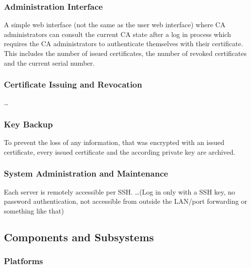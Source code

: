\documentclass{article}
\begin{document}
\subsubsection{Administration Interface}

A simple web interface (not the same as the user web interface) where CA administrators can consult the current CA state after a log in process which requires the CA administrators to authenticate themselves with their certificate. This includes the number of issued certificates, the number of revoked certificates and the current serial number.

\subsubsection{Certificate Issuing and Revocation}

\dots

\subsubsection{Key Backup}

To prevent the loss of any information, that was encrypted with an issued certificate, every issued certificate and the according private key are archived.

\subsubsection{System Administration and Maintenance}

Each server is remotely accessible per SSH. \dots (Log in only with a SSH key, no password authentication, not accessible from outside the LAN/port forwarding or something like that)

\subsection{Components and Subsystems}

\subsubsection{Platforms}
\end{document}
